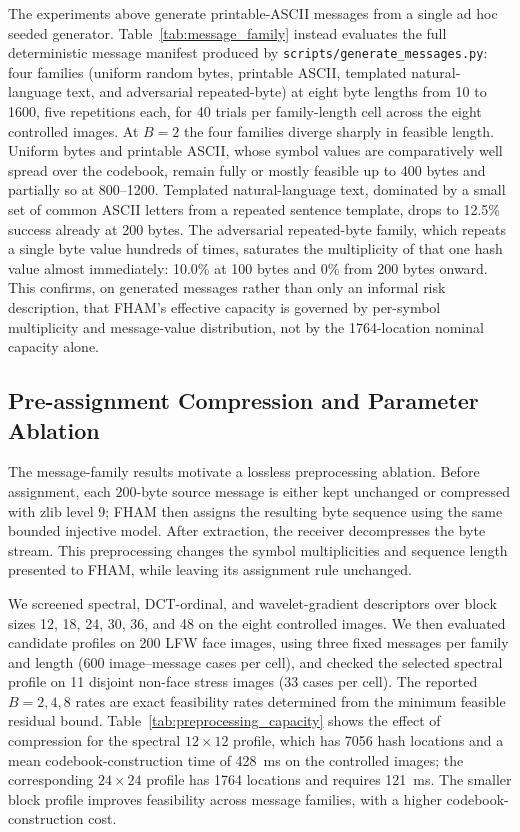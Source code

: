 \documentclass[preprint,12pt]{elsarticle}
\theoremstyle{plain}
\begin{document}
The experiments above generate printable-ASCII messages from a single ad hoc
seeded generator. Table~\ref{tab:message_family} instead evaluates the full
deterministic message manifest produced by \texttt{scripts/generate\_messages.py}:
four families (uniform random bytes, printable ASCII, templated natural-language text, and
adversarial repeated-byte) at eight byte lengths from 10 to 1600, five
repetitions each, for 40 trials per family-length cell across the eight
controlled images. At $B=2$ the four families diverge sharply in feasible
length. Uniform bytes and printable ASCII, whose symbol values are
comparatively well spread over the codebook, remain fully or mostly feasible
up to 400 bytes and partially so at 800--1200. Templated natural-language text, dominated by a
small set of common ASCII letters from a repeated sentence template, drops to
12.5\% success already at 200 bytes. The adversarial repeated-byte family,
which repeats a single byte value hundreds of times, saturates the
multiplicity of that one hash value almost immediately: 10.0\% at 100 bytes
and 0\% from 200 bytes onward. This confirms, on generated messages rather
than only an informal risk description, that FHAM's effective capacity is
governed by per-symbol multiplicity and message-value distribution, not by
the 1764-location nominal capacity alone.

\begin{table}[!t]
\centering
\caption{Assignment Feasibility Rate by Message Family and Length ($B=2$)}
\label{tab:message_family}

\end{table}

\subsection{Pre-assignment Compression and Parameter Ablation}
The message-family results motivate a lossless preprocessing ablation. Before
assignment, each 200-byte source message is either kept unchanged or compressed
with zlib level 9; FHAM then assigns the resulting byte sequence using the same
bounded injective model. After extraction, the receiver decompresses the byte
stream. This preprocessing changes the symbol multiplicities and sequence
length presented to FHAM, while leaving its assignment rule unchanged.

We screened spectral, DCT-ordinal, and wavelet-gradient descriptors over block
sizes 12, 18, 24, 30, 36, and 48 on the eight controlled images. We then
evaluated candidate profiles on 200 LFW face images, using three fixed messages
per family and length (600 image--message cases per cell), and checked the
selected spectral profile on 11 disjoint non-face stress images (33 cases per
cell). The reported $B=2,4,8$ rates are exact feasibility rates determined from
the minimum feasible residual bound. Table~\ref{tab:preprocessing_capacity}
shows the effect of compression for the spectral $12\times12$ profile, which
has 7056 hash locations and a mean codebook-construction time of 428~ms on the
controlled images; the corresponding $24\times24$ profile has 1764 locations
and requires 121~ms. The smaller block profile improves feasibility across
message families, with a higher codebook-construction cost.
\end{document}
